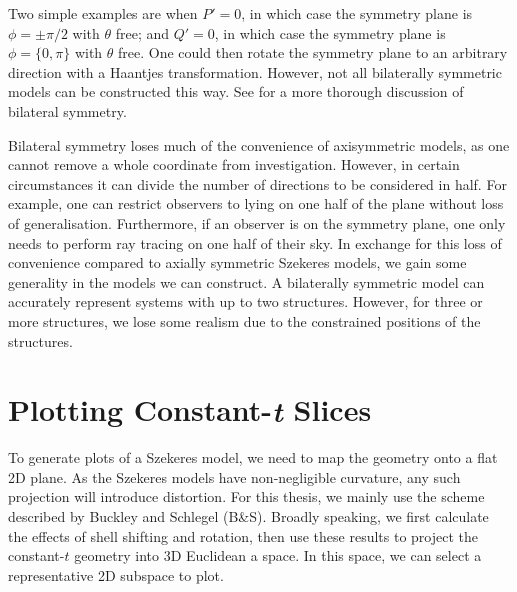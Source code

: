 \documentclass[a4paper,12pt]{report}
\begin{document}
Two simple examples are when $P'=0$, in which case the symmetry plane is $\phi=\pm \pi/2$ with $\theta$ free; and $Q'=0$, in which case the symmetry plane is $\phi = \{0,\pi\}$ with $\theta$ free. One could then rotate the symmetry plane to an arbitrary direction with a Haantjes transformation. However, not all bilaterally symmetric models can be constructed this way. See \cite{RN1} for a more thorough discussion of bilateral symmetry.

Bilateral symmetry loses much of the convenience of axisymmetric models, as one cannot remove a whole coordinate from investigation. However, in certain circumstances it can divide the number of directions to be considered in half. For example, one can restrict observers to lying on one half of the plane without loss of generalisation. Furthermore, if an observer is on the symmetry plane, one only needs to perform ray tracing on one half of their sky. In exchange for this loss of convenience compared to axially symmetric Szekeres models, we gain some generality in the models we can construct. A bilaterally symmetric model can accurately represent systems with up to two structures. However, for three or more structures, we lose some realism due to the constrained positions of the structures.


\section{Plotting Constant-\textit{t} Slices} \label{section: szekeres - plotting}
To generate plots of a Szekeres model, we need to map the geometry onto a flat 2D plane. As the Szekeres models have non-negligible curvature, any such projection will introduce distortion. For this thesis, we mainly use the scheme described by Buckley and Schlegel \cite{RN1} (B\&S). Broadly speaking, we first calculate the effects of shell shifting and rotation, then use these results to project the constant-$t$ geometry into 3D Euclidean a space. In this space, we can select a representative 2D subspace to plot.
\end{document}
